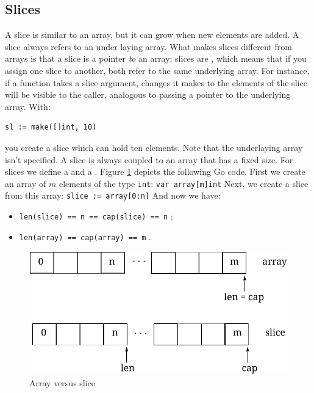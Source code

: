 \subsection{Slices}
\label{sec:slices}
A slice is similar to an array, but it can grow when new elements
are added.
A slice always refers to an under laying array. What makes slices different
from
arrays is that a slice is a pointer \emph{to} an array;
slices are , 
which means that if you assign one slice to
another, both refer to the same underlying array. For instance, if a
function takes a slice argument, changes it makes to the elements of the
slice will be visible to the caller, analogous to passing a pointer to
the underlying array. With:
\begin{lstlisting}
sl := make([]int, 10)
\end{lstlisting}
you create a slice which can hold ten elements. Note that the
underlaying array isn't specified.
A slice is always coupled to an array that has
a fixed size. For slices we define a  and a
. 
Figure \ref{fig:array-vs-slice} depicts the following Go code.
First we create an array of $m$ elements of the type \lstinline{int}:
\lstinline{var array[m]int}\newline
Next, we create a slice from this array:
\lstinline{slice := array[0:n]}\newline
And now we have:
\begin{itemize}
\item{\lstinline{len(slice) == n == cap(slice) == n}{} ;}
\item{\lstinline{len(array) == cap(array) == m}{} .}
\end{itemize}
\begin{figure}[H]
\caption{Array versus slice}
\label{fig:array-vs-slice}
\begin{center}
\includegraphics[scale=0.65]{fig/array-vs-slice.pdf}
\end{center}
\end{figure}

